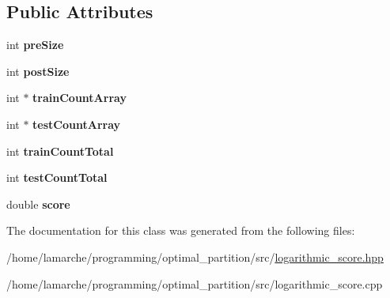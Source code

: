 \subsection*{Public Attributes}
\begin{DoxyCompactItemize}
\item 
\hypertarget{classLogarithmicScoreValue_a553cdae1ae69f229316b73a360589776}{int {\bfseries pre\-Size}}\label{classLogarithmicScoreValue_a553cdae1ae69f229316b73a360589776}

\item 
\hypertarget{classLogarithmicScoreValue_a8b15f92de2d4e003b4a3826c7817b2f8}{int {\bfseries post\-Size}}\label{classLogarithmicScoreValue_a8b15f92de2d4e003b4a3826c7817b2f8}

\item 
\hypertarget{classLogarithmicScoreValue_a7faf693e6b53450f8bdf3d9b8c2bda9b}{int $\ast$ {\bfseries train\-Count\-Array}}\label{classLogarithmicScoreValue_a7faf693e6b53450f8bdf3d9b8c2bda9b}

\item 
\hypertarget{classLogarithmicScoreValue_a3cd25470e851035b0b953ab19d3416e6}{int $\ast$ {\bfseries test\-Count\-Array}}\label{classLogarithmicScoreValue_a3cd25470e851035b0b953ab19d3416e6}

\item 
\hypertarget{classLogarithmicScoreValue_a5bee04d8401da678ac83f77efd0c6e4a}{int {\bfseries train\-Count\-Total}}\label{classLogarithmicScoreValue_a5bee04d8401da678ac83f77efd0c6e4a}

\item 
\hypertarget{classLogarithmicScoreValue_a4a6de49414afc11d8505313d385f8552}{int {\bfseries test\-Count\-Total}}\label{classLogarithmicScoreValue_a4a6de49414afc11d8505313d385f8552}

\item 
\hypertarget{classLogarithmicScoreValue_aaeac28c5557929803745879f6a1e65d7}{double {\bfseries score}}\label{classLogarithmicScoreValue_aaeac28c5557929803745879f6a1e65d7}

\end{DoxyCompactItemize}


The documentation for this class was generated from the following files\-:\begin{DoxyCompactItemize}
\item 
/home/lamarche/programming/optimal\-\_\-partition/src/\hyperlink{logarithmic__score_8hpp}{logarithmic\-\_\-score.\-hpp}\item 
/home/lamarche/programming/optimal\-\_\-partition/src/logarithmic\-\_\-score.\-cpp\end{DoxyCompactItemize}
